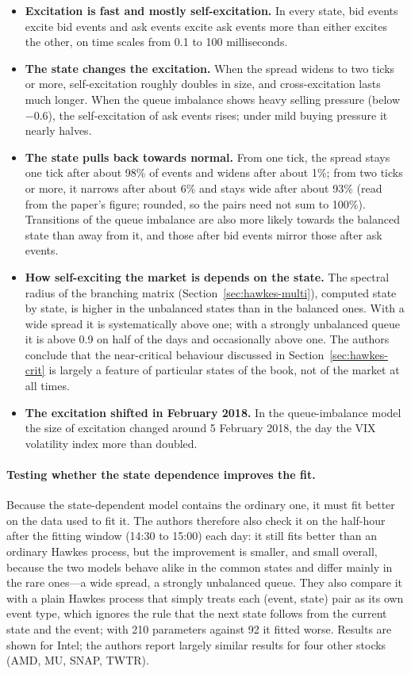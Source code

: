 \begin{itemize}[leftmargin=1.5em,itemsep=1pt]
\item \textbf{Excitation is fast and mostly self-excitation.} In every state, bid events excite bid events and
  ask events excite ask events more than either excites the other, on time scales from 0.1 to 100 milliseconds.
\item \textbf{The state changes the excitation.} When the spread widens to two ticks or more, self-excitation
  roughly doubles in size, and cross-excitation lasts much longer. When the queue imbalance shows heavy selling
  pressure (below $-0.6$), the self-excitation of ask events rises; under mild buying pressure it nearly halves.
\item \textbf{The state pulls back towards normal.} From one tick, the spread stays one tick after about 98\% of
  events and widens after about 1\%; from two ticks or more, it narrows after about 6\% and stays wide after
  about 93\% (read from the paper's figure; rounded, so the pairs need not sum to 100\%). Transitions of the queue imbalance are also more likely towards the balanced
  state than away from it, and those after bid events mirror those after ask events.
\item \textbf{How self-exciting the market is depends on the state.} The spectral radius of the branching matrix
  (Section~\ref{sec:hawkes-multi}), computed state by state, is higher in the unbalanced states than in the
  balanced ones. With a wide spread it is systematically above one; with a strongly unbalanced queue it is
  above 0.9 on half of the days and occasionally above one. The authors conclude that the near-critical
  behaviour discussed in Section~\ref{sec:hawkes-crit} is largely a feature of particular states of the book,
  not of the market at all times.
\item \textbf{The excitation shifted in February 2018.} In the queue-imbalance model the size of excitation
  changed around 5 February 2018, the day the VIX volatility index more than doubled.
\end{itemize}

\paragraph{Testing whether the state dependence improves the fit.} Because the state-dependent model contains the ordinary one, it must fit
better on the data used to fit it. The authors therefore also check it on the half-hour after the fitting
window (14:30 to 15:00) each day: it still fits better than an ordinary Hawkes process, but the improvement is
smaller, and small overall, because the two models behave alike in the common states and differ mainly in the
rare ones---a wide spread, a strongly unbalanced queue. They also compare it with a plain Hawkes process that
simply treats each (event, state) pair as its own event type, which ignores the rule that the next state follows
from the current state and the event; with 210 parameters against 92 it fitted worse. Results are shown for
Intel; the authors report largely similar results for four other stocks (AMD, MU, SNAP, TWTR).

